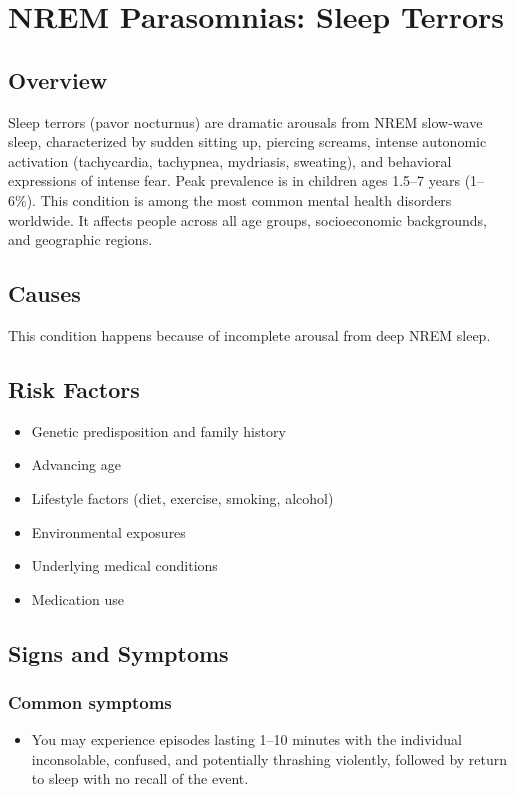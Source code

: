 \chapter{NREM Parasomnias: Sleep Terrors}
\label{sec:Sleep Terrors}

\section{Overview}
Sleep terrors (pavor nocturnus) are dramatic arousals from NREM slow-wave sleep, characterized by sudden sitting up, piercing screams, intense autonomic activation (tachycardia, tachypnea, mydriasis, sweating), and behavioral expressions of intense fear. Peak prevalence is in children ages 1.5--7 years (1--6\%). This condition is among the most common mental health disorders worldwide. It affects people across all age groups, socioeconomic backgrounds, and geographic regions.
\section{Causes}
This condition happens because of incomplete arousal from deep NREM sleep.     
\section{Risk Factors}

\begin{itemize}[noitemsep]
  \item Genetic predisposition and family history
  \item Advancing age
  \item Lifestyle factors (diet, exercise, smoking, alcohol)
  \item Environmental exposures
  \item Underlying medical conditions
  \item Medication use
\end{itemize}
\section{Signs and Symptoms}

\subsection{Common symptoms}
\begin{itemize}[noitemsep]
  \item You may experience episodes lasting 1--10 minutes with the individual inconsolable, confused, and potentially thrashing violently, followed by return to sleep with no recall of the event. 
  \end{itemize}

